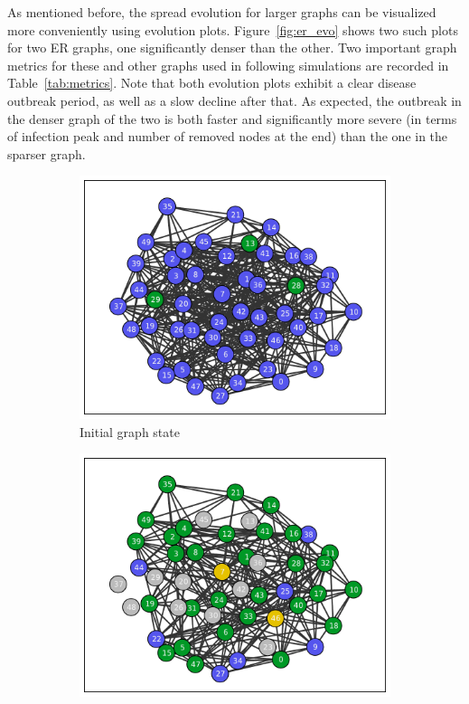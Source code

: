 \documentclass[11pt]{article} %
\begin{document}
As mentioned before, the spread evolution for larger graphs can be visualized
more conveniently using evolution plots. Figure~\ref{fig:er_evo} shows two such
plots for two ER graphs, one significantly denser than the other. Two important
graph metrics for these and other graphs used in following simulations are
recorded in Table~\ref{tab:metrics}. Note that both evolution plots exhibit
a clear disease outbreak period, as well as a slow decline after that.
As expected, the outbreak in the denser graph of the two is both faster and
significantly more severe (in terms of infection peak and number of removed nodes
at the end) than the one in the sparser graph.

\begin{figure}[tbp]
  \begin{subfigure}[b]{0.5\textwidth}
    \centering
    \includegraphics[width=\textwidth]{figures/evo_ER_50_03_init}
    \caption{Initial graph state}
  \end{subfigure}
  \begin{subfigure}[b]{0.5\textwidth}
    \centering
    \includegraphics[width=\textwidth]{figures/evo_ER_50_03_10}

\end{subfigure}
\end{figure}
\end{document}
